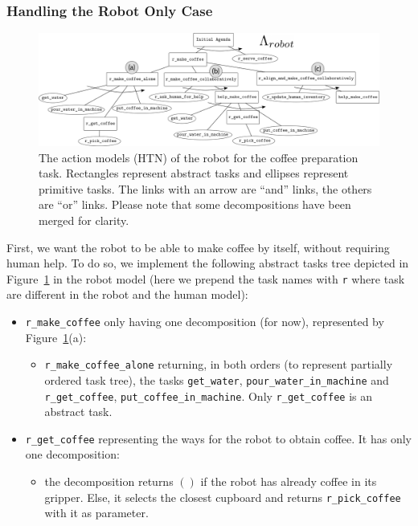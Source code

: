 \documentclass[a4paper,11pt,twoside]{StyleThese}
\begin{document}
\subsubsection{Handling the Robot Only Case}
\label{subsubsec:chap4coffeerobotonly}
\begin{figure}[hbtp]
\centering
\includegraphics[height=0.47\textwidth, angle=90, origin=c]{figures/chapter4/HTN_r_coffee.png}
\caption{The action models (HTN) of the robot for the coffee preparation task. Rectangles represent abstract tasks and ellipses represent primitive tasks. The links with an arrow are ``and'' links, the others are ``or'' links. Please note that some decompositions have been merged for clarity.}
\label{fig:chap4rhtncoffee}
\end{figure}

First, we want the robot to be able to make coffee by itself, without requiring human help. To do so, we implement the following abstract tasks tree depicted in Figure~\ref{fig:chap4rhtncoffee} in the robot model (here we prepend the task names with \verb'r' where task are different in the robot and the human model):

\begin{itemize}
\item \verb'r_make_coffee' only having one decomposition (for now), represented by Figure~\ref{fig:chap4rhtncoffee}(a):
	\begin{itemize}
	\item \verb'r_make_coffee_alone' returning, in both orders (to represent partially ordered task tree), the tasks \verb'get_water', \verb'pour_water_in_machine' and \verb'r_get_coffee', \verb'put_coffee_in_machine'. Only \verb'r_get_coffee' is an abstract task.
	\end{itemize}
\item \verb'r_get_coffee' representing the ways for the robot to obtain coffee. It has only one decomposition:
	\begin{itemize}
	\item the decomposition returns $()$ if the robot has already coffee in its gripper. Else, it selects the closest cupboard and returns \verb'r_pick_coffee' with it as parameter.
	\end{itemize}
\end{itemize}
\end{document}
